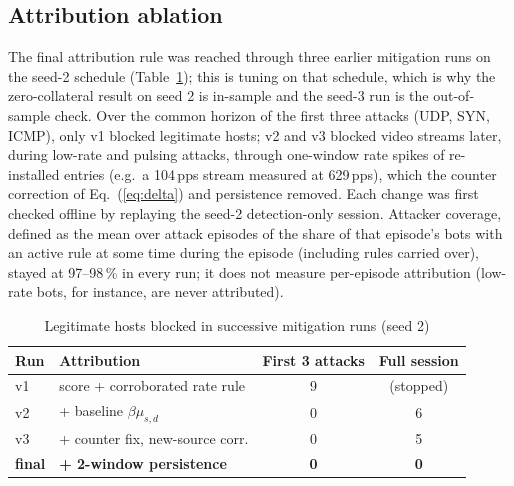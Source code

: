 \documentclass[conference]{IEEEtran}
\begin{document}
\subsection{Attribution ablation}\label{sec:ablation}
The final attribution rule was reached through three earlier mitigation runs on the seed-2 schedule (Table~\ref{tab:abl}); this is tuning on that schedule, which is why the zero-collateral result on seed 2 is in-sample and the seed-3 run is the out-of-sample check. Over the common horizon of the first three attacks (UDP, SYN, ICMP), only v1 blocked legitimate hosts; v2 and v3 blocked video streams later, during low-rate and pulsing attacks, through one-window rate spikes of re-installed entries (e.g.\ a 104\,pps stream measured at 629\,pps), which the counter correction of Eq.~(\ref{eq:delta}) and persistence removed. Each change was first checked offline by replaying the seed-2 detection-only session. Attacker coverage, defined as the mean over attack episodes of the share of that episode's bots with an active rule at some time during the episode (including rules carried over), stayed at 97--98\,\% in every run; it does not measure per-episode attribution (low-rate bots, for instance, are never attributed).

\begin{table}[t]
\caption{Legitimate hosts blocked in successive mitigation runs (seed 2)}
\label{tab:abl}
\centering
\setlength{\tabcolsep}{3pt}
\begin{tabular}{llcc}
\toprule
Run & Attribution & First 3 attacks & Full session \\
\midrule
v1 & score + corroborated rate rule & 9 & (stopped) \\
v2 & + baseline $\beta\mu_{s,d}$ & 0 & 6 \\
v3 & + counter fix, new-source corr. & 0 & 5 \\
\textbf{final} & \textbf{+ 2-window persistence} & \textbf{0} & \textbf{0} \\
\bottomrule
\end{tabular}
\end{table}
\end{document}
